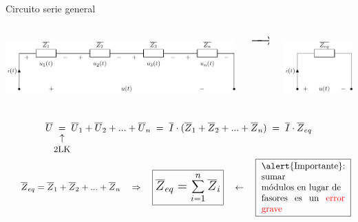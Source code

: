 \documentclass[aspectratio=169, usenames,svgnames,dvipsnames]{beamer}
\begin{document}
\begin{frame}{Circuito serie general}
    
    \vspace{4mm}    
    \begin{columns}
    \begin{column}{0.68\linewidth} 
        \hspace{-6mm} \includegraphics[height=2.5cm]{../figs/serie_general.pdf}
    \end{column}
    \begin{column}{0.03\linewidth}
        \vspace{1mm}

        \hspace*{-3mm}$\LARGE \xrightarrow{\hspace*{0.5cm}}$ %
    \end{column}
    \begin{column}{0.19\linewidth}
        \includegraphics[height=2.5cm]{../figs/serie_general_eq.pdf}
    \end{column}
    \end{columns}

    \begin{equation*}
		\overline{U} \; \underarrow[=][\uparrow]{\vspace{-3mm}\small 2LK} \; \overline{U}_1+\overline{U}_2+...+\overline{U}_n \; = \; \overline{I} \cdot(\overline{Z}_1+\overline{Z}_2+...+\overline{Z}_n) \; = \; \overline{I}\cdot\overline{Z}_{eq}
	\end{equation*}

    \vspace{-6.5mm}
	\begin{equation*}
		\quad\;\; \overline{Z}_{eq}=\overline{Z}_1+\overline{Z}_2+...+\overline{Z}_n\quad \Rightarrow \quad {\Large \boxed{ \overline{Z}_{eq} = \sum_{i=1}^n \overline{Z}_i} }
        \quad \leftarrow \quad
        \boxed{\text{ \begin{minipage}{0.27\linewidth}\alert{Importante}: sumar\\ módulos en lugar de \\fasores es un \textcolor{red}{error grave} \end{minipage} } }
	\end{equation*}


\end{frame}
\end{document}
